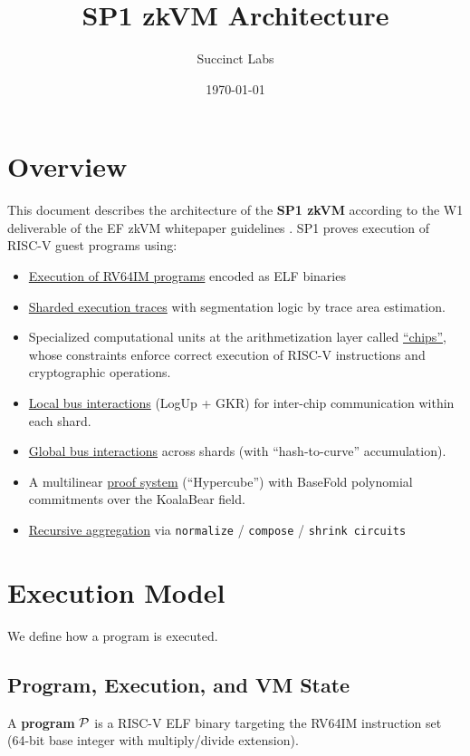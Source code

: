\documentclass[11pt]{article}
\title{SP1 zkVM Architecture}
\author{Succinct Labs\\[8pt]}
\date{\today}
\begin{document}
\maketitle

\section*{Overview}

This document describes the architecture of the \textbf{SP1 zkVM}
according to the W1 deliverable of the EF zkVM whitepaper
guidelines \cite{efZkvmGuidelines}.
SP1 proves execution of RISC-V guest programs using:

\begin{itemize}
\item \hyperref[sec:exec]{Execution of RV64IM programs} encoded as ELF binaries
\item \hyperref[sec:seg]{Sharded execution traces} with segmentation logic by trace area estimation.
\item Specialized computational units at the arithmetization layer called \hyperref[sec:core]{``chips''}, whose constraints
enforce correct execution of RISC-V instructions and cryptographic operations.
\item \hyperref[sec:bus]{Local bus interactions} (LogUp + GKR) for inter-chip communication within each shard.
\item \hyperref[sec:memory]{Global bus interactions} across shards (with ``hash-to-curve'' accumulation).
\item A multilinear \hyperref[sec:proof-system]{proof system} (``Hypercube'') with BaseFold polynomial commitments over the KoalaBear field.
\item \hyperref[sec:proof-arch]{Recursive aggregation} via \texttt{normalize} / \texttt{compose} / \texttt{shrink circuits}
\end{itemize}

\section{Execution Model}\label{sec:exec}
We define how a program is executed.

\subsection{Program, Execution, and VM State}

A \textbf{program} $\mathcal{P}$ is a RISC-V ELF binary targeting the RV64IM
instruction set (64-bit base integer with multiply/divide extension).
\end{document}
